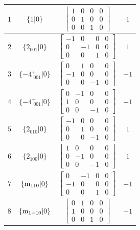 \documentclass[fleqn,8pt]{jsarticle}
\begin{document}
\begin{longtable}{cccc}
$ 1 $ & $ \{1|0\} $ & $ \begin{bmatrix} 1 & 0 & 0 & 0 \\ 0 & 1 & 0 & 0 \\ 0 & 0 & 1 & 0 \end{bmatrix} $ & $ 1 $ \\ \hline
$ 2 $ & $ \{2{}_{001}|0\} $ & $ \begin{bmatrix} -1 & 0 & 0 & 0 \\ 0 & -1 & 0 & 0 \\ 0 & 0 & 1 & 0 \end{bmatrix} $ & $ 1 $ \\ \hline
$ 3 $ & $ \{-4^{+}_{\,\,001}|0\} $ & $ \begin{bmatrix} 0 & 1 & 0 & 0 \\ -1 & 0 & 0 & 0 \\ 0 & 0 & -1 & 0 \end{bmatrix} $ & $ -1 $ \\ \hline
$ 4 $ & $ \{-4^{-}_{\,\,001}|0\} $ & $ \begin{bmatrix} 0 & -1 & 0 & 0 \\ 1 & 0 & 0 & 0 \\ 0 & 0 & -1 & 0 \end{bmatrix} $ & $ -1 $ \\ \hline
$ 5 $ & $ \{2{}_{010}|0\} $ & $ \begin{bmatrix} -1 & 0 & 0 & 0 \\ 0 & 1 & 0 & 0 \\ 0 & 0 & -1 & 0 \end{bmatrix} $ & $ 1 $ \\ \hline
$ 6 $ & $ \{2{}_{100}|0\} $ & $ \begin{bmatrix} 1 & 0 & 0 & 0 \\ 0 & -1 & 0 & 0 \\ 0 & 0 & -1 & 0 \end{bmatrix} $ & $ 1 $ \\ \hline
$ 7 $ & $ \{{\rm m}_{110}|0\} $ & $ \begin{bmatrix} 0 & -1 & 0 & 0 \\ -1 & 0 & 0 & 0 \\ 0 & 0 & 1 & 0 \end{bmatrix} $ & $ -1 $ \\ \hline
$ 8 $ & $ \{{\rm m}_{1-10}|0\} $ & $ \begin{bmatrix} 0 & 1 & 0 & 0 \\ 1 & 0 & 0 & 0 \\ 0 & 0 & 1 & 0 \end{bmatrix} $ & $ -1 $ \\
\end{longtable}
\end{document}
